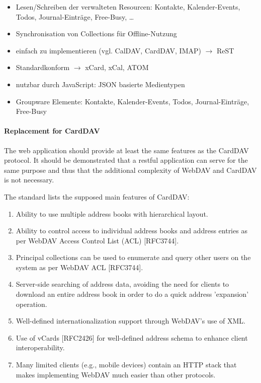 \documentclass[12pt,a4paper]{scrartcl}		%
\begin{document}
\begin{itemize}
  \item Lesen/Schreiben der verwalteten Resourcen: Kontakte, Kalender-Events, Todos, Journal-Einträge, Free-Busy, \ldots
  \item Synchronisation von Collections für Offline-Nutzung
  \item einfach zu implementieren (vgl. CalDAV, CardDAV, IMAP) $\rightarrow$ ReST
  \item Standardkonform $\rightarrow$ xCard, xCal, ATOM
  \item nutzbar durch JavaScript: JSON basierte Medientypen
  \item Groupware Elemente: Kontakte, Kalender-Events, Todos, Journal-Einträge, Free-Busy
\end{itemize}


\paragraph{Replacement for CardDAV}

The web application should provide at least the same features as the CardDAV
protocol. It should be demonstrated that a restful application can serve for the
same purpose and thus that the additional complexity of WebDAV and CardDAV is
not necessary.

The standard lists the supposed main features of CardDAV\cite[sec. 1]{RFC6352}:

\begin{enumerate}
\item Ability to use multiple address books with hierarchical layout.
\item Ability to control access to individual address books and address entries
  as per WebDAV Access Control List (ACL) [RFC3744].
\item Principal collections can be used to enumerate and query other users on
  the system as per WebDAV ACL [RFC3744].
\item Server-side searching of address data, avoiding the need for clients to
  download an entire address book in order to do a quick address 'expansion'
  operation.
\item Well-defined internationalization support through WebDAV's use of XML.
\item Use of vCards [RFC2426] for well-defined address schema to enhance client
  interoperability.
\item Many limited clients (e.g., mobile devices) contain an HTTP stack that
  makes implementing WebDAV much easier than other protocols.
\end{enumerate}
\end{document}
